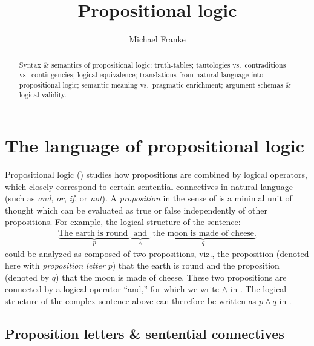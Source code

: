 \documentclass[nobib,nofonts]{tufte-handout}
\title{Propositional logic}
\author[M.~Franke]{Michael Franke}
\date{} %
\newcommand{\proplog}{\acro{PropLog}}
\begin{document}
\maketitle

\begin{abstract}
\noindent
Syntax \& semantics of propositional logic; truth-tables; tautologies vs.~contraditions vs.~contingencies; logical equivalence; translations from natural language into propositional logic; semantic meaning vs.~pragmatic enrichment; argument schemas \& logical validity.
\end{abstract}

\section{The language of propositional logic}

Propositional logic (\proplog) studies how propositions are combined by logical operators, which closely correspond to certain sentential connectives in natural language (such as \emph{and}, \emph{or}, \emph{if}, or \emph{not}).
A \textit{proposition} in the sense of \proplog is a minimal unit of thought which can be evaluated as true or false independently of other propositions.
For example, the logical structure of the sentence:
%
\begin{align*}
  \underbrace{\text{The earth is round }}_{p}
  \underbrace{\text{ and }}_{\wedge}
  \underbrace{\text{ the moon is made of cheese.}}_{q}
\end{align*}
%
could be analyzed as composed of two propositions, viz., the proposition (denoted here with \emph{proposition letter} $p$) that the earth is round and the proposition (denoted by $q$) that the moon is made of cheese.
These two propositions are connected by a logical operator ``and,'' for which we write $\wedge$ in \proplog.
The logical structure of the complex sentence above can therefore be written as $p \wedge q$ in \proplog.

\subsection{Proposition letters \& sentential connectives}
\end{document}
